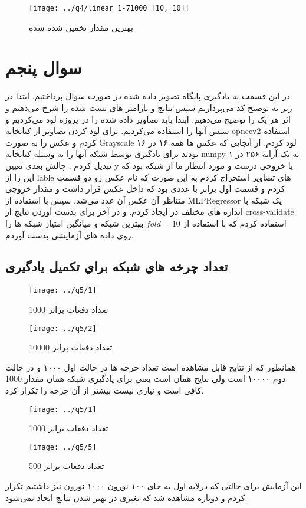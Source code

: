 \documentclass[a4paper,12pt]{article}
\begin{document}
\begin{figure}[!htb]
\begin{center}
  \texttt{[image: ../q4/linear\_1-71000\_[10, 10]]}
  \center
  \caption{ بهترین مقدار تخمین شده شده}
\end{center}
\end{figure}

\newpage
\section{سوال پنجم}
در این قسمت به یادگیری پایگاه تصویر داده شده در صورت سوال پرداختیم. ابتدا در زیر به توضیح کد می‌پردازیم سپس نتایج و پارامتر های تست شده را شرح می‌دهیم و اثر هر یک را توضیح می‌دهیم. ابتدا باید تصاویر داده شده را در پروژه لود می‌کردیم و سپس آنها را استفاده می‌کردیم. برای لود کردن تصاویر از کتابخانه opnecv2 استفاده کردم و عکس را به صورت Grayscale لود کردم. از آنجایی که عکس ها همه ۱۶ در ۱۶ بودند برای یادگیری توسط شبکه آنها را به وسیله کتابخانه numpy به یک آرایه ۲۵۶ در ۱ تبدیل کردم . چالش بعدی تعیین y یا خروجی درست و مورد انتظار ما از شبکه بود که این را از lable های تصاویر استخراج کردم به این صورت که نام عکس رو دو قسمت کردم و قسمت اول برابر با عددی بود که داخل عکس قرار داشت و مقدار خروجی متناظر آن عکس آن عدد می‌شد. سپس با استفاده از MLPRegressor یک شبکه با اندازه های مختلف در ایجاد کردم. و در آخر برای بدست آوردن نتایج از cross-validate استفاده کردم که با استفاده از $ fold = 10 $ بهترین شبکه و میانگین امتیاز شبکه ها را روی داده های آزمایشی بدست آوردم.

\subsection{تعداد چرخه هاي شبکه براي تکمیل یادگیری }

\begin{figure}[!htb]
  \texttt{[image: ../q5/1]}
  \caption{ تعداد دفعات برابر 1000 }
\endminipage\hfill
{}
  \texttt{[image: ../q5/2]}
  \caption{ تعداد دفعات برابر 10000 }
\endminipage\hfill
\end{figure}

همانطور که از نتایج قابل مشاهده است تعداد چرخه ها در حالت اول ۱۰۰۰ و در حالت دوم ۱۰۰۰۰ است ولی نتایح همان است یعنی برای یادگیری شبکه همان مقدار 1000 کافی است و نیازی نیست بیشتر از آن چرخه را تکرار کرد.
\begin{figure}[!htb]
  \texttt{[image: ../q5/1]}
  \caption{ تعداد دفعات برابر 1000 }
\endminipage\hfill
{}
  \texttt{[image: ../q5/5]}
  \caption{ تعداد دفعات برابر 500 }
\endminipage\hfill
\end{figure}
این آزمایش برای حالتی که درلایه اول به جای ۱۰۰ نورون ۱۰۰۰ نورون نیز داشتیم تکرار کردم و دوباره مشاهده شد که تغیری در بهتر شدن نتایج ایجاد نمی‌شود.
\end{document}
